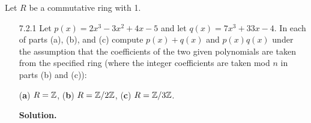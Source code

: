 Let $R$ be a commutative ring with 1.
\begin{enumerate}
   \item[7.2.1]   Let $p(x) = 2x^3 - 3x^2 + 4x - 5$ and let
                  $q(x) = 7x^3 + 33x - 4$. In each of parts (a), (b), and (c)
                  compute $p(x) + q(x)$ and $p(x)q(x)$ under the assumption that
                  the coefficients of the two given polynomials are taken from
                  the specified ring (where the integer coefficients are taken
                  mod $n$ in parts (b) and (c)):
                  
                  (\textbf{a}) $R = \mathbb{Z}$, \quad (\textbf{b}) $R = \mathbb{Z}/2\mathbb{Z}$, \quad
                  (\textbf{c}) $R = \mathbb{Z}/3\mathbb{Z}$.

      \textbf{Solution.}
   

\end{enumerate}
